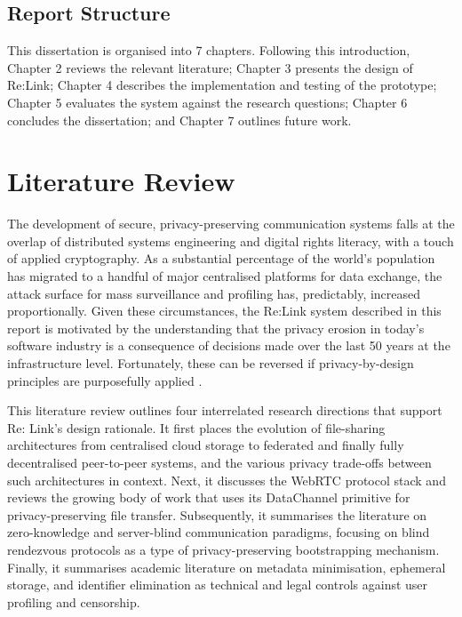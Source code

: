 \documentclass[12pt,a4paper]{article}
\begin{document}
\subsection{Report Structure}

This dissertation is organised into 7 chapters. Following this introduction, Chapter 2 reviews the relevant literature; Chapter 3 presents the design of Re:Link; Chapter 4 describes the implementation and testing of the prototype; Chapter 5 evaluates the system against the research questions; Chapter 6 concludes the dissertation; and Chapter 7 outlines future work.

\section{Literature Review}

The development of secure, privacy-preserving communication systems falls at the overlap of distributed systems engineering and digital rights literacy, with a touch of applied cryptography. As a substantial percentage of the world’s population has migrated to a handful of major centralised platforms for data exchange, the attack surface for mass surveillance and profiling has, predictably, increased proportionally. Given these circumstances, the Re:Link system described in this report is motivated by the understanding that the privacy erosion in today’s software industry is a consequence of decisions made over the last 50 years at the infrastructure level. Fortunately, these can be reversed if privacy-by-design principles are purposefully applied \cite{cavoukian2011}.

This literature review outlines four interrelated research directions that support Re: Link’s design rationale. It first places the evolution of file-sharing architectures from centralised cloud storage to federated and finally fully decentralised peer-to-peer systems, and the various privacy trade-offs between such architectures in context. Next, it discusses the WebRTC protocol stack and reviews the growing body of work that uses its DataChannel primitive for privacy-preserving file transfer. Subsequently, it summarises the literature on zero-knowledge and server-blind communication paradigms, focusing on blind rendezvous protocols as a type of privacy-preserving bootstrapping mechanism. Finally, it summarises academic literature on metadata minimisation, ephemeral storage, and identifier elimination as technical and legal controls against user profiling and censorship.
\end{document}
